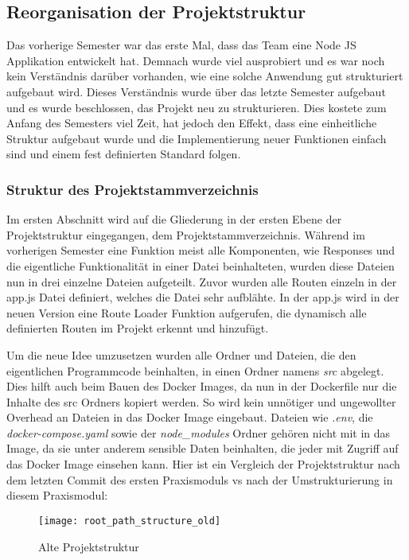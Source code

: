 \subsection{Reorganisation der Projektstruktur}\label{subsec:subsection-two-one}

Das vorherige Semester war das erste Mal, dass das Team eine Node JS Applikation entwickelt hat.
Demnach wurde viel ausprobiert und es war noch kein Verständnis darüber vorhanden, wie eine solche Anwendung gut strukturiert aufgebaut wird.
Dieses Verständnis wurde über das letzte Semester aufgebaut und es wurde beschlossen, das Projekt neu zu strukturieren.
Dies kostete zum Anfang des Semesters viel Zeit, hat jedoch den Effekt, dass eine einheitliche Struktur aufgebaut wurde und die Implementierung neuer Funktionen einfach sind und einem fest definierten Standard folgen.

\subsubsection{Struktur des Projektstammverzeichnis}
Im ersten Abschnitt wird auf die Gliederung in der ersten Ebene der Projektstruktur eingegangen, dem Projektstammverzeichnis.
Während im vorherigen Semester eine Funktion meist alle Komponenten, wie Responses und die eigentliche Funktionalität in einer Datei beinhalteten, wurden diese Dateien nun in drei einzelne Dateien aufgeteilt.
Zuvor wurden alle Routen einzeln in der app.js Datei definiert, welches die Datei sehr aufblähte.
In der app.js wird in der neuen Version eine Route Loader Funktion aufgerufen, die dynamisch alle definierten Routen im Projekt erkennt und hinzufügt.

Um die neue Idee umzusetzen wurden alle Ordner und Dateien, die den eigentlichen Programmcode beinhalten, in einen Ordner namens \textit{src} abgelegt.
Dies hilft auch beim Bauen des Docker Images, da nun in der Dockerfile nur die Inhalte des src Ordners kopiert werden.
So wird kein unnötiger und ungewollter Overhead an Dateien in das Docker Image eingebaut.
Dateien wie \textit{.env}, die \textit{docker-compose.yaml} sowie der \textit{node\_modules} Ordner gehören nicht mit in das Image, da sie unter anderem sensible Daten beinhalten, die jeder mit Zugriff auf das Docker Image einsehen kann.
Hier ist ein Vergleich der Projektstruktur nach dem letzten Commit des ersten Praxismoduls vs nach der Umstrukturierung in diesem Praxismodul:
\begin{figure}[h]
  \centering
  \texttt{[image: root\_path\_structure\_old]}
  \caption{Alte Projektstruktur}
  \label{fig:root_path_structure_old}
\end{figure}


